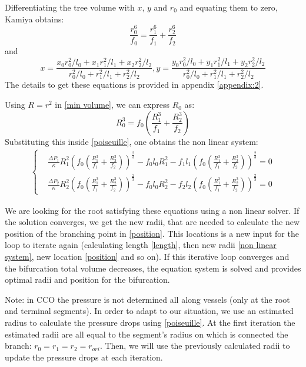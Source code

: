\documentclass[a4paper, 11pt]{article} %
\begin{document}
Differentiating the tree volume with $x$, $y$ and $r_0$ and equating them to zero, Kamiya obtains:
\begin{equation}
\frac{r_0^6}{f_0} = \frac{r_1^6}{f_1} + \frac{r_2^6}{f_2}
\label{min volume}
\end{equation}
and 
\begin{equation}
x = \frac{x_0 r_0^2/l_0 + x_1 r_1^2/l_1 + x_2 r_2^2/l_2}{r_0^2/l_0 + r_1^2/l_1 + r_2^2 / l_2},
y = \frac{y_0 r_0^2/l_0 + y_1 r_1^2/l_1 + y_2 r_2^2/l_2}{r_0^2/l_0 + r_1^2/l_1 + r_2^2 / l_2}
\label{position}
\end{equation}
The details to get these equations is provided in appendix \ref{appendix:2}.

Using $R = r^2$ in \eqref{min volume}, we can express $R_0$ as:
\begin{equation}
R_0^3 = f_0(\frac{R_1^3}{f_1} + \frac{R_2^3}{f_2})
\end{equation} 
Substituting this inside \eqref{poiseuille}, one obtains the non linear system:
\begin{align}
\begin{cases}
&\frac{\Delta P_1}{\kappa}R_1^2 \left(f_0(\frac{R_1^3}{f_1} + \frac{R_2^3}{f_2}) \right)^\frac{2}{3} -f_0l_0R_1^2 - f_1l_1\left(f_0(\frac{R_1^3}{f_1} + \frac{R_2^3}{f_2}) \right)^\frac{2}{3} = 0 \\
&\frac{\Delta P_2}{\kappa}R_2^2 \left(f_0(\frac{R_1^3}{f_1} + \frac{R_2^3}{f_2}) \right)^\frac{2}{3} -f_0l_0R_2^2 - f_2l_2\left(f_0(\frac{R_1^3}{f_1} + \frac{R_2^3}{f_2}) \right)^\frac{2}{3} = 0
\end{cases}
\label{non linear system}
\end{align}

We are looking for the root satisfying these equations using a non linear solver. If the solution converges, we get the new radii, that are needed to calculate the new position of the branching point in \eqref{position}. This locations is a new input for the loop to iterate again (calculating length \eqref{length}, then new radii \eqref{non linear system}, new location \eqref{position} and so on). 
If this iterative loop converges and the bifurcation total volume decreases, the equation system is solved and provides optimal radii and position for the bifurcation.

Note: in CCO the pressure is not determined all along vessels (only at the root and terminal segments). In order to adapt to our situation, we use an estimated radius to calculate the pressure drops using \eqref{poiseuille}. At the first iteration the estimated radii are all equal to the segment's radius on which is connected the branch: $r_0 = r_1 = r_2 = r_{ori}$.
Then, we will use the previously calculated radii to update the pressure drops at each iteration.
\end{document}

